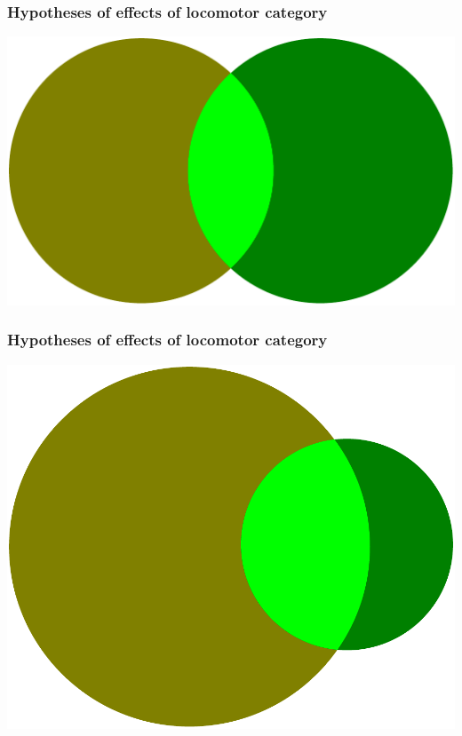 \documentclass{beamer}
\begin{document}
\begin{frame}
  \frametitle{Hypotheses of effects of locomotor category}
  \begin{center}
    \includegraphics[width = \textwidth,height = 0.8\textheight,keepaspectratio = true]{figure/loco_initial}
  \end{center}
\end{frame}

\begin{frame}
  \frametitle{Hypotheses of effects of locomotor category}
  \begin{center}
    \includegraphics[width = \textwidth,height = 0.8\textheight,keepaspectratio = true]{figure/loco_later}
  \end{center}
\end{frame}
\end{document}
